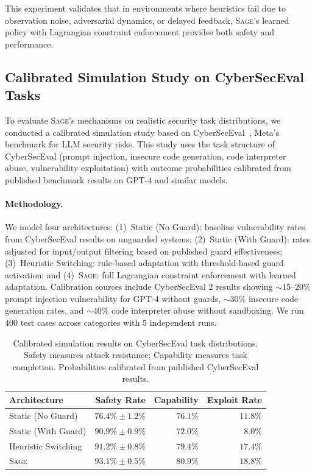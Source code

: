 \documentclass[sigconf,anonymous]{acmart}
\newcommand{\SAGE}{\textsc{Sage}\xspace}
\begin{document}
This experiment validates that in environments where heuristics fail due to observation noise, adversarial dynamics, or delayed feedback, \SAGE's learned policy with Lagrangian constraint enforcement provides both safety and performance.

\subsection{Calibrated Simulation Study on CyberSecEval Tasks}

To evaluate \SAGE's mechanisms on realistic security task distributions, we conducted a calibrated simulation study based on CyberSecEval~\cite{bhatt2024cyberseceval2}, Meta's benchmark for LLM security risks. This study uses the task structure of CyberSecEval (prompt injection, insecure code generation, code interpreter abuse, vulnerability exploitation) with outcome probabilities calibrated from published benchmark results on GPT-4 and similar models.

\paragraph{Methodology.} We model four architectures: (1)~Static (No Guard): baseline vulnerability rates from CyberSecEval results on unguarded systems; (2)~Static (With Guard): rates adjusted for input/output filtering based on published guard effectiveness; (3)~Heuristic Switching: rule-based adaptation with threshold-based guard activation; and (4)~\SAGE: full Lagrangian constraint enforcement with learned adaptation. Calibration sources include CyberSecEval 2 results showing $\sim$15--20\% prompt injection vulnerability for GPT-4 without guards, $\sim$30\% insecure code generation rates, and $\sim$40\% code interpreter abuse without sandboxing. We run $400$ test cases across categories with $5$ independent runs.

\begin{table}[t]
\centering
\caption{Calibrated simulation results on CyberSecEval task distributions. Safety measures attack resistance; Capability measures task completion. Probabilities calibrated from published CyberSecEval results.}
\label{tab:cyberseceval}
\begin{tabular}{lrrr}
\toprule
Architecture & Safety Rate & Capability & Exploit Rate \\
\midrule
Static (No Guard) & $76.4\% \pm 1.2\%$ & $76.1\%$ & $11.8\%$ \\
Static (With Guard) & $90.9\% \pm 0.9\%$ & $72.0\%$ & $8.0\%$ \\
Heuristic Switching & $91.2\% \pm 0.8\%$ & $79.4\%$ & $17.4\%$ \\
\SAGE & $93.1\% \pm 0.5\%$ & $80.9\%$ & $18.8\%$ \\
\bottomrule
\end{tabular}
\end{table}
\end{document}
